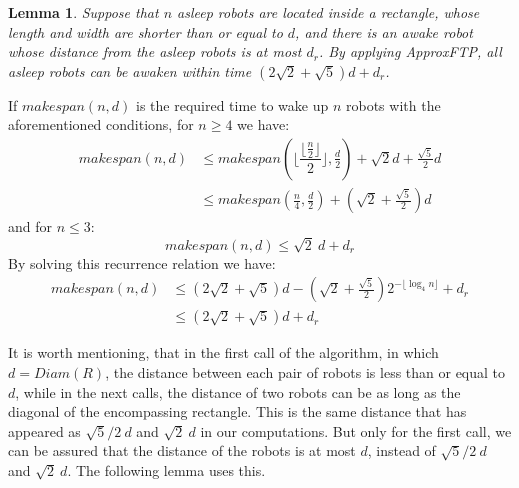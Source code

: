 \documentclass[review]{elsarticle}
\newtheorem{lemma}[theorem]{Lemma}
\def\QED{\ensuremath{{\square}}}
\def\markatright#1{\leavevmode\unskip\nobreak\quad\hspace*{\fill}{#1}}
\newenvironment{proof}
  {\begin{trivlist}\item[\hskip\labelsep{\bf Proof.}]}
  {\markatright{\QED}\end{trivlist}}
\begin{document}
\begin{lemma}
\label{lem:1}
Suppose that $n$ asleep robots are located inside a rectangle, whose length and width are shorter than or equal to $d$, and there is an awake robot whose distance from the asleep robots is at most $d_r$. By applying \textit{ApproxFTP}, all asleep robots can be awaken within time ${ (2\sqrt{2}+\sqrt{5})d+d_r }$.
\end{lemma}
\begin{proof}
If ${ makespan(n,d) }$ is the required time to wake up $n$ robots with the aforementioned conditions, for ${ n\geq 4 }$ we have:
\begin{align}
makespan(n,d) &\leq makespan(\bigg\lfloor \dfrac{\lfloor\frac{n}{2}\rfloor}{2} \bigg\rfloor, \frac{d}{2})+\!\sqrt{2}d+\!\frac{\sqrt{5}}{2}d \nonumber\\
				&\leq makespan(\frac{n}{4}, \frac{d}{2})+(\sqrt{2}+\frac{\sqrt{5}}{2})d \nonumber
\end{align}
and for ${ n\le 3 }$:
$$ makespan(n,d) \leq \sqrt{2} ~d+d_r $$
By solving this recurrence relation we have:
\begin{align}
makespan(n,d) &\leq (2\sqrt{2}+\!\sqrt{5})d-\!(\sqrt{2}+\!\frac{\sqrt{5}}{2}) 2^{-\!\lfloor\log_4n \rfloor}+d_r \nonumber\\
				&\leq (2\sqrt{2}+\!\sqrt{5})d+d_r \nonumber
\end{align}
\end{proof}
It is worth mentioning, that in the first call of the algorithm, in which ${ d=Diam(R) }$, the distance between each pair of robots is less than or equal to $d$, while in the next calls, the distance of two robots can be as long as the diagonal of the encompassing rectangle. This is the same distance that has appeared as ${ \sqrt{5}/2~d }$ and ${ \sqrt{2}~d }$ in our computations. But only for the first call, we can be assured that the distance of the robots is at most $d$, instead of  ${ \sqrt{5}/2~d }$ and ${ \sqrt{2}~d }$. The following lemma uses this.
\end{document}
